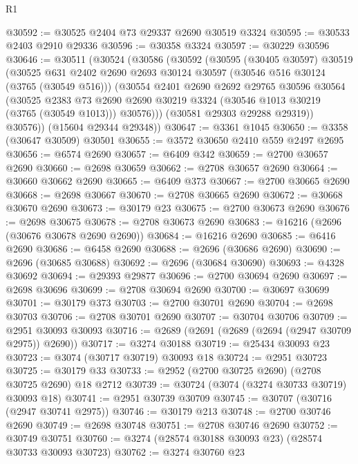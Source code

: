 \begin{lexlean}{R1}
\begin{coremodule}
@30592 := @30525 @2404 @73 @29337 @2690 @30519 @3324
@30595 := @30533 @2403 @2910 @29336
@30596 := @30358 @3324
@30597 := @30229 @30596
@30646 := @30511
    (@30524
      (@30586
        (@30592
          (@30595
            (@30405 @30597)
            @30519
            (@30525
              @631
              @2402
              @2690
              @2693
              @30124
              @30597
              (@30546 @516 @30124 (@3765 (@30549 @516)))
              (@30554
                @2401
                @2690
                @2692
                @29765
                @30596
                @30564
                (@30525
                  @2383
                  @73
                  @2690
                  @2690
                  @30219
                  @3324
                  (@30546 @1013 @30219 (@3765 (@30549 @1013)))
                  @30576)))
            (@30581 @29303 @29288 @29319))
          @30576))
      (@15604 @29344 @29348))
@30647 := @3361 @1045
@30650 := @3358 (@30647 @30509) @30501
@30655 := @3572 @30650 @2410 @559 @2497 @2695
@30656 := @6574 @2690
@30657 := @6409 @342
@30659 := @2700 @30657 @2690
@30660 := @2698 @30659
@30662 := @2708 @30657 @2690
@30664 := @30660 @30662 @2690
@30665 := @6409 @373
@30667 := @2700 @30665 @2690
@30668 := @2698 @30667
@30670 := @2708 @30665 @2690
@30672 := @30668 @30670 @2690
@30673 := @30179 @23
@30675 := @2700 @30673 @2690
@30676 := @2698 @30675
@30678 := @2708 @30673 @2690
@30683 := @16216 (@2696 (@30676 @30678 @2690 @2690))
@30684 := @16216 @2690
@30685 := @6416 @2690
@30686 := @6458 @2690
@30688 := @2696 (@30686 @2690)
@30690 := @2696 (@30685 @30688)
@30692 := @2696 (@30684 @30690)
@30693 := @4328 @30692
@30694 := @29393 @29877
@30696 := @2700 @30694 @2690
@30697 := @2698 @30696
@30699 := @2708 @30694 @2690
@30700 := @30697 @30699
@30701 := @30179 @373
@30703 := @2700 @30701 @2690
@30704 := @2698 @30703
@30706 := @2708 @30701 @2690
@30707 := @30704 @30706
@30709 := @2951 @30093 @30093
@30716 := @2689 (@2691 (@2689 (@2694 (@2947 @30709 @2975)) @2690))
@30717 := @3274 @30188
@30719 := @25434 @30093 @23
@30723 := @3074 (@30717 @30719) @30093 @18
@30724 := @2951 @30723
@30725 := @30179 @33
@30733 := @2952 (@2700 @30725 @2690) (@2708 @30725 @2690) @18 @2712
@30739 := @30724 (@3074 (@3274 @30733 @30719) @30093 @18)
@30741 := @2951 @30739 @30709
@30745 := @30707 (@30716 (@2947 @30741 @2975))
@30746 := @30179 @213
@30748 := @2700 @30746 @2690
@30749 := @2698 @30748
@30751 := @2708 @30746 @2690
@30752 := @30749 @30751
@30760 := @3274 (@28574 @30188 @30093 @23) (@28574 @30733 @30093 @30723)
@30762 := @3274 @30760 @23

\end{coremodule}
\end{lexlean}
